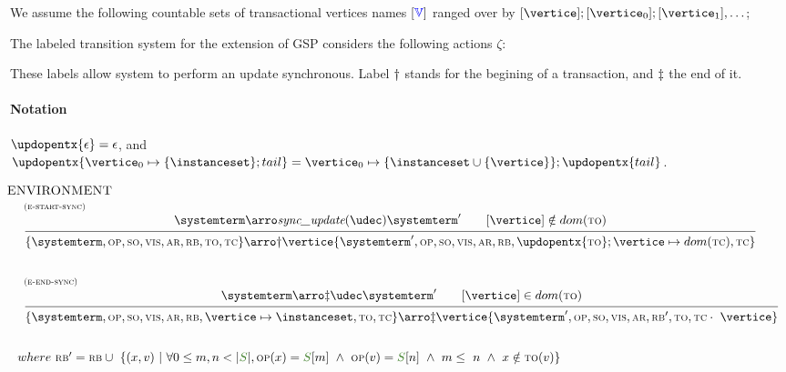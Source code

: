 

We assume the following countable sets of transactional vertices names $[\textcolor{blue}{\mathbb{V}}]$ ranged over by $[\vertice];[\vertice_0];[\vertice_1],\ldots$;

The labeled transition system for the extension of GSP considers the following actions $\zeta$:	




These labels allow system to perform an update synchronous. Label $\dagger$ stands for the begining of a transaction, and $\ddagger$ the end of it.

\paragraph{Notation} $\updopentx{\epsilon} = \epsilon$, and 
   $\updopentx{\vertice_0 \mapsto \{\instanceset\};tail} = \vertice_0 \mapsto \{\instanceset \cup \{\vertice\}\};\updopentx{tail}$.
		





		
 \[
 \begin{array}{l}    \hspace{-.3cm} \textsc{ENVIRONMENT}\\

		
\mathrule{e-start-sync}{\systemterm \arroi{\syncupdtran{\tupdate}} \systemterm' \qquad [\vertice] \notin 
dom(\tx)}{\environmenttran{\systemterm}{\op}{\so}{\vis}{\arb}{\rb}{\tx}{\tc} \arroi{\startsynctran{\vertice}} \environmenttran{\systemterm'}{\op}{\so}{\vis}{\arb}{\rb}{\updopentx{\tx};\vertice \mapsto dom(\tc)}{\tc}}

 \\[35pt]
{
\mathrule{e-end-sync}{\systemterm \arroi{\finishsynctran{\tupdate}} \systemterm' \qquad [\vertice] \in 
dom(\tx)}{\environmenttran{\systemterm}{\op}{\so}{\vis}{\arb}{\rb}{\vertice \mapsto \instanceset,\tx}{\tc} \arroi{\finishsynctran{\vertice}} \environmenttran{\systemterm'}{\op}{\so}{\vis}{\arb}{\rb'}{\tx}{\tc \cdot\ \vertice}}}
\\
 \\[10pt]where \ 
\rb' = \rb \cup\ \{ (x,v) \ | \ \forall 0 \leq m,n < |\queuemessage|, \op(x) = \queuemessage[m] \ \land \ \op(v) = \queuemessage[n] \ \land \ m \leq\ n \ \land \ x\notin\tx(v) \}
 \end{array}
 \]




